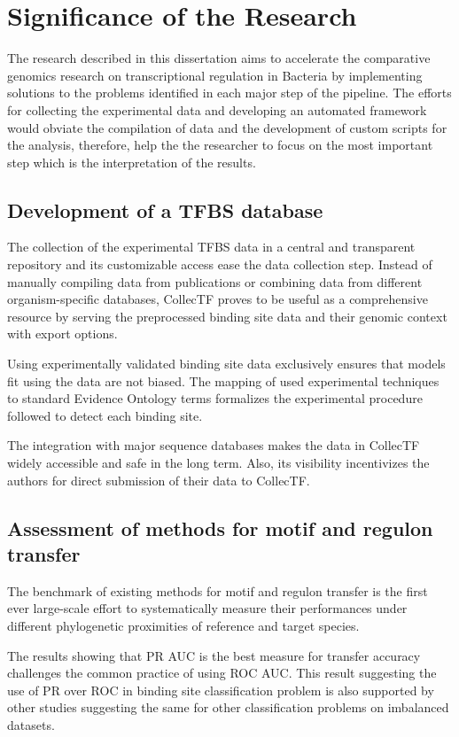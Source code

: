 \section{Significance of the Research}

The research described in this dissertation aims to accelerate the comparative
genomics research on transcriptional regulation in Bacteria by implementing
solutions to the problems identified in each major step of the pipeline. The
efforts for collecting the experimental data and developing an automated
framework would obviate the compilation of data and the development of custom
scripts for the analysis, therefore, help the the researcher to focus on the
most important step which is the interpretation of the results.

\subsection{Development of a TFBS database}

The collection of the experimental TFBS data in a central and transparent
repository and its customizable access ease the data collection step. Instead
of manually compiling data from publications or combining data from different
organism-specific databases, CollecTF proves to be useful as a comprehensive
resource by serving the preprocessed binding site data and their genomic
context with export options.

Using experimentally validated binding site data exclusively ensures that
models fit using the data are not biased. The mapping of used experimental
techniques to standard Evidence Ontology terms formalizes the experimental
procedure followed to detect each binding site.

The integration with major sequence databases makes the data in CollecTF widely
accessible and safe in the long term. Also, its visibility incentivizes the
authors for direct submission of their data to CollecTF.

\subsection{Assessment of methods for motif and regulon transfer}

The benchmark of existing methods for motif and regulon transfer is the first
ever large-scale effort to systematically measure their performances under
different phylogenetic proximities of reference and target species.

The results showing that PR AUC is the best measure for transfer accuracy
challenges the common practice of using ROC AUC\@. This result suggesting the
use of PR over ROC in binding site classification problem is also supported by
other studies suggesting the same for other classification problems on
imbalanced datasets.

